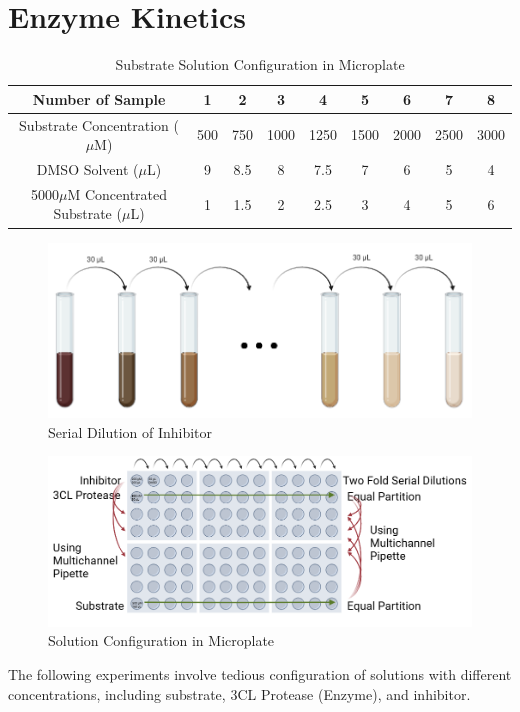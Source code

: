 \documentclass{report}
\begin{document}
\section{Enzyme Kinetics}
\begin{table}
    \centering
    \caption{Substrate Solution Configuration in Microplate}
    
    \begin{tabular}{|c|c|c|c|c|c|c|c|c|} \hline
        Number of Sample&1&2&3&4&5&6&7&8 \\ \hline
        Substrate Concentration ($\mu$M)&500&750&1000&1250&1500&2000&2500&3000 \\ \hline
        DMSO Solvent ($\mu$L)& 9&8.5&8&7.5&7&6&5&4\\ \hline
        5000$\mu$M Concentrated Substrate ($\mu$L)&1&1.5&2&2.5&3&4&5&6 \\ \hline
    \end{tabular}
    \label{Substrate Solution Configuration in Microplate}
\end{table}
\begin{figure}
    \centering
    \includegraphics[width=0.7\linewidth]{../Figures/serial dilution.png}
    \caption{Serial Dilution of Inhibitor}
    \label{Serial Dilution of Inhibitor}
\end{figure}
\begin{figure}
    \centering
    \includegraphics[width=1\linewidth]{../Figures/microplate.png}
    \caption{Solution Configuration in Microplate}
    \label{Inhibitor Solution Configuration in Microplate}
\end{figure}
The following experiments involve tedious configuration of solutions with different concentrations, including substrate, 3CL Protease (Enzyme), and inhibitor.
\end{document}

